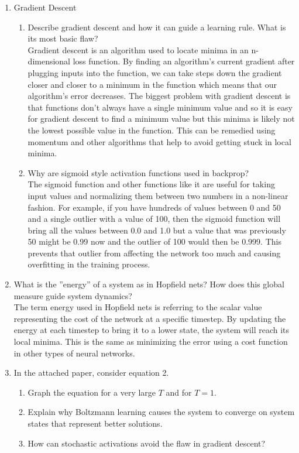 \documentclass[notitlepage]{report}
\theoremstyle{plain} %
\theoremstyle{definition} %
\theoremstyle{plain} %
\begin{document}
\begin{enumerate}
\item Gradient Descent
	\begin{enumerate}
	\item Describe gradient descent and how it can guide a learning rule. What is its most basic flaw?
	\medskip\\
		Gradient descent is an algorithm used to locate minima in an n-dimensional loss function. By finding an algorithm's current gradient after plugging inputs into the function, we can take steps down the gradient closer and closer to a minimum in the function which means that our algorithm's error decreases. The biggest problem with gradient descent is that functions don't always have a single minimum value and so it is easy for gradient descent to find a minimum value but this minima is likely not the lowest possible value in the function. This can be remedied using momentum and other algorithms that help to avoid getting stuck in local minima.
	\item Why are sigmoid style activation functions used in backprop?
	\medskip\\
		The sigmoid function and other functions like it are useful for taking input values and normalizing them between two numbers in a non-linear fashion. For example, if you have hundreds of values between 0 and 50 and a single outlier with a value of 100, then the sigmoid function will bring all the values between 0.0 and 1.0 but a value that was previously 50 might be 0.99 now and the outlier of 100 would then be 0.999. This prevents that outlier from affecting the network too much and causing overfitting in the training process.
	\end{enumerate}

\item What is the ''energy'' of a system as in Hopfield nets? How does this global measure guide system dynamics?
\medskip\\
	The term energy used in Hopfield nets is referring to the scalar value representing the cost of the network at a specific timestep. By updating the energy at each timestep to bring it to a lower state, the system will reach its local minima. This is the same as minimizing the error using a cost function in other types of neural networks.
	
\item In the attached paper, consider equation 2.
	\begin{enumerate}
	\item Graph the equation for a very large $T$ and for $T=1$.
	\item Explain why Boltzmann learning causes the system to converge on system states that represent better solutions.
	\item How can stochastic activations avoid the flaw in gradient descent?
	\end{enumerate}
\end{enumerate}
\end{document}
